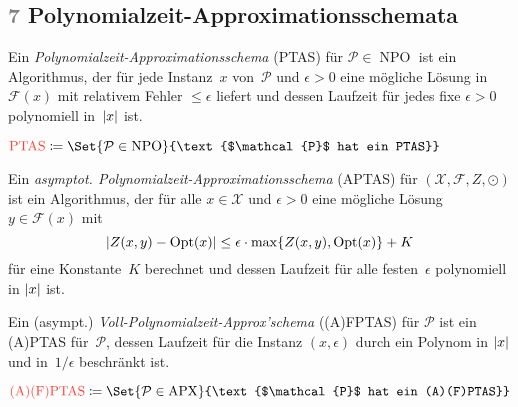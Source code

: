 \documentclass{cheat-sheet}
\newcommand{\Instances}{\mathcal{X}} %
\newcommand{\Feasible}{\mathcal{F}} %
\newcommand{\ObjFun}{Z} %
\newcommand{\Goal}{\odot} %
\newcommand{\OptTuple}{(\Instances{}, \Feasible{}, \ObjFun{}, \Goal)} %
\DeclareMathOperator{\Opt}{Opt} %
\newcommand{\size}[1]{\abs{#1}} %
\DeclareMathOperator{\NPO}{NPO} %
\DeclareMathOperator{\PO}{PO} %
\DeclareMathOperator{\APX}{APX} %
\DeclareMathOperator{\PTAS}{PTAS} %
\DeclareMathOperator{\APTAS}{APTAS} %
\DeclareMathOperator{\FPTAS}{FPTAS} %
\DeclareMathOperator{\AFPTAS}{AFPTAS} %
\newcommand{\Prob}{\mathcal{P}} %
\newcommand{\Defn}[1]{\textcolor{DefinitionColor}{#1}}
\newcommand{\scriptSection}[1]{\textcolor{gray}{#1}\enspace}
\begin{document}
\subsection{\scriptSection{7} Polynomialzeit-Approximationsschemata}

\begin{defn}
  Ein \emph{Polynomialzeit-Approximationsschema} (PTAS) für $\Prob \in \NPO$ ist ein Algorithmus, der für jede Instanz~$x$ von~$\Prob$ und $\epsilon > 0$ eine mögliche Lösung in~$\Feasible(x)$ mit relativem Fehler $\leq \epsilon$ liefert und dessen Laufzeit für jedes fixe $\epsilon > 0$ polynomiell in~$\size{x}$ ist.
\end{defn}

\begin{defn}
  $\Defn{\PTAS} \coloneqq \Set{\Prob \in \NPO}{\text{$\Prob$ hat ein PTAS}}$
\end{defn}

\begin{defn}
  Ein \emph{asymptot. Polynomialzeit-Approximationsschema} (APTAS) für $\OptTuple{}$ ist ein Algorithmus, der für alle $x \in \Instances{}$ und $\epsilon > 0$ eine mögliche Lösung $y \in \Feasible(x)$ mit
  \[ \abs{Z(x, y) - \Opt(x)} \leq \epsilon \cdot \max \{ Z(x,y), \Opt(x) \} + K \]
  für eine Konstante~$K$ berechnet und dessen Laufzeit für alle festen~$\epsilon$ polynomiell in $\size{x}$ ist.
\end{defn}

\begin{defn}
  Ein (asympt.) \emph{Voll-Polynomialzeit-Approx'schema} ((A)FPTAS) für $\Prob{}$ ist ein (A)PTAS für~$\Prob{}$, dessen Laufzeit für die Instanz $(x, \epsilon)$ durch ein Polynom in $\size{x}$ und in~$1/\epsilon$ beschränkt ist.
\end{defn}

\begin{defn}
  $\Defn{\mathrm{(A)(F)PTAS}} \coloneqq \Set{\Prob \in \APX}{\text{$\Prob$ hat ein (A)(F)PTAS}}$
\end{defn}

\begin{center}
\end{center}
\end{document}
